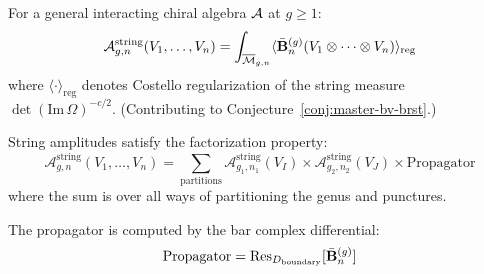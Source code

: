 \begin{conjecture}\label{conj:string-amplitude}
For a general interacting chiral algebra $\mathcal{A}$ at
$g \geq 1$:
\[
\mathcal{A}_{g,n}^{\mathrm{string}}(V_1, \ldots, V_n)
= \int_{\overline{\mathcal{M}}_{g,n}}
\langle \bar{\mathbf{B}}^{(g)}_n
(V_1 \otimes \cdots \otimes V_n)
\rangle_{\mathrm{reg}}
\]
where $\langle \cdot \rangle_{\mathrm{reg}}$ denotes
Costello regularization of the string measure
$\det(\mathrm{Im}\,\Omega)^{-c/2}$.
(Contributing to Conjecture~\ref{conj:master-bv-brst}.)
\end{conjecture}


\begin{theorem}\label{thm:amplitude-factorization}
String amplitudes satisfy the factorization property:
\[\mathcal{A}_{g,n}^{\mathrm{string}}(V_1, \ldots, V_n) = \sum_{\mathrm{partitions}} \mathcal{A}_{g_1,n_1}^{\mathrm{string}}(V_I) \times \mathcal{A}_{g_2,n_2}^{\mathrm{string}}(V_J) \times \mathrm{Propagator}\]
where the sum is over all ways of partitioning the genus and punctures.

The propagator is computed by the bar complex differential:
\[\mathrm{Propagator} = \operatorname{Res}_{D_{\mathrm{boundary}}}[\bar{\mathbf{B}}^{(g)}_n]\]
\end{theorem}

